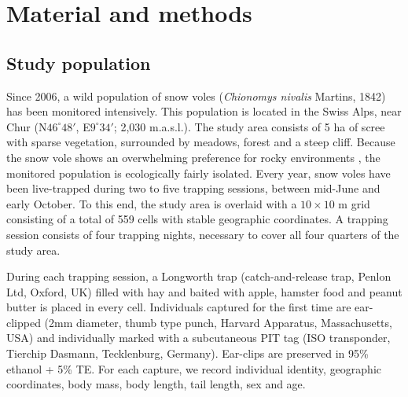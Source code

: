 \section*{Material and methods}
\subsection*{Study population}
Since 2006, a wild population of snow voles (\textit{Chionomys nivalis} Martins, 1842) has been monitored intensively. This population is located in the Swiss Alps, near Chur (N$46^\circ48'$, E$9^\circ34'$; 2,030 m.a.s.l.). The study area consists of 5 ha of scree with sparse vegetation, surrounded by meadows, forest and a steep cliff. Because the snow vole shows an overwhelming preference for rocky environments \parencite{Janeau1997, Luque-larena2002}, the monitored population is ecologically fairly isolated. 
Every year, snow voles have been live-trapped during two to five trapping sessions, between mid-June and early October. To this end, the study area is overlaid with a $10\times10$ m grid consisting of a total of 559 cells with stable geographic coordinates. A trapping session consists of four trapping nights, necessary to cover all four quarters of the study area.

During each trapping session, a Longworth trap (catch-and-release trap, Penlon Ltd, Oxford, UK) filled with hay and baited with apple, hamster food and peanut butter is placed in every cell. Individuals captured for the first time are ear-clipped (2mm diameter, thumb type punch, Harvard Apparatus, Massachusetts, USA) and individually marked with a subcutaneous PIT tag (ISO transponder, Tierchip Dasmann, Tecklenburg, Germany). Ear-clips are preserved in 95\% ethanol + 5\% TE. For each capture, we record individual identity, geographic coordinates, body mass, body length, tail length, sex and age.

